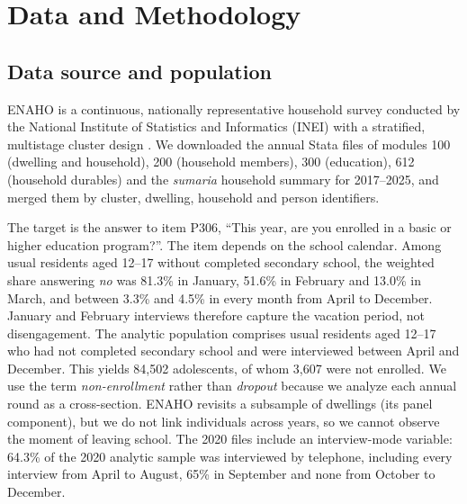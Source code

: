 \documentclass[conference]{IEEEtran}
\begin{document}
\section{Data and Methodology}

\subsection{Data source and population}
ENAHO is a continuous, nationally representative household survey conducted by the National Institute of Statistics and Informatics (INEI) with a stratified, multistage cluster design \cite{inei}. We downloaded the annual Stata files of modules 100 (dwelling and household), 200 (household members), 300 (education), 612 (household durables) and the \textit{sumaria} household summary for 2017--2025, and merged them by cluster, dwelling, household and person identifiers.

The target is the answer to item P306, ``This year, are you enrolled in a basic or higher education program?''. The item depends on the school calendar. Among usual residents aged 12--17 without completed secondary school, the weighted share answering \textit{no} was 81.3\% in January, 51.6\% in February and 13.0\% in March, and between 3.3\% and 4.5\% in every month from April to December. January and February interviews therefore capture the vacation period, not disengagement. The analytic population comprises usual residents aged 12--17 who had not completed secondary school and were interviewed between April and December. This yields 84,502 adolescents, of whom 3,607 were not enrolled. We use the term \textit{non-enrollment} rather than \textit{dropout} because we analyze each annual round as a cross-section. ENAHO revisits a subsample of dwellings (its panel component), but we do not link individuals across years, so we cannot observe the moment of leaving school. The 2020 files include an interview-mode variable: 64.3\% of the 2020 analytic sample was interviewed by telephone, including every interview from April to August, 65\% in September and none from October to December.
\end{document}
